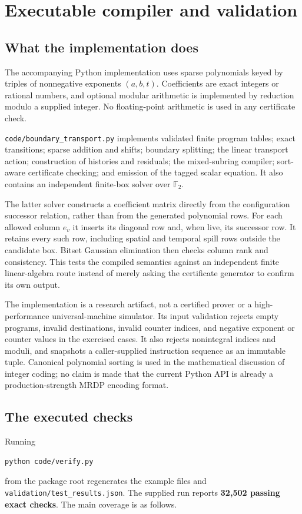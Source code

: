 \documentclass[11pt,letterpaper]{article}
\numberwithin{equation}{section}
\theoremstyle{definition}
\newcommand{\Fbb}{\mathbb F}
\begin{document}
\section{Executable compiler and validation}\label{pwh:bt:sec:validation}

\subsection{What the implementation does}
The accompanying Python implementation uses sparse polynomials keyed by
triples of nonnegative exponents $(a,b,t)$. Coefficients are exact
integers or rational numbers, and optional modular arithmetic is
implemented by reduction modulo a supplied integer. No floating-point
arithmetic is used in any certificate check.

\texttt{code/boundary\_transport.py} implements validated finite program
tables; exact transitions; sparse addition and shifts; boundary
splitting; the linear transport action; construction of histories and
residuals; the mixed-subring compiler; sort-aware certificate checking;
and emission of the tagged scalar equation. It also contains an
independent finite-box solver over $\Fbb_2$.

The latter solver constructs a coefficient matrix directly from the
configuration successor relation, rather than from the generated
polynomial rows. For each allowed column $e_v$ it inserts its diagonal
row and, when live, its successor row. It retains every such row,
including spatial and temporal spill rows outside the candidate box.
Bitset Gaussian elimination then checks column rank and consistency.
This tests the compiled semantics against an independent finite
linear-algebra route instead of merely asking the certificate generator
to confirm its own output.

The implementation is a research artifact, not a certified prover or a
high-performance universal-machine simulator. Its input validation
rejects empty programs, invalid destinations, invalid counter indices,
and negative exponent or counter values in the exercised cases. It also
rejects nonintegral indices and moduli, and snapshots a caller-supplied
instruction sequence as an immutable tuple.
Canonical polynomial sorting is used in the mathematical discussion of
integer coding; no claim is made that the current Python API is already
a production-strength MRDP encoding format.

\subsection{The executed checks}
Running
\begin{lstlisting}
python code/verify.py
\end{lstlisting}
from the package root regenerates the example files and
\texttt{validation/test\_results.json}. The supplied run reports
\textbf{32,502 passing exact checks}. The main coverage is as follows.
\end{document}
